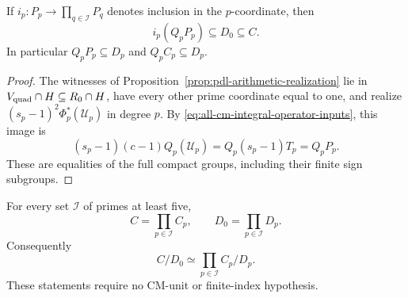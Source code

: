 \begin{lemma}\label{lem:all-cm-isolated-axes}
If \(i_p:P_p\to\prod_{q\in\mathcal I}P_q\)
denotes inclusion in the \(p\)-coordinate, then
\[
                           i_p(Q_pP_p)\subseteq D_0\subseteq C.
\]
In particular \(Q_pP_p\subseteq D_p\) and \(Q_pC_p\subseteq D_p\).
\end{lemma}

\begin{proof}
The witnesses of Proposition~\ref{prop:pdl-arithmetic-realization}
lie in \(V_{\rm quad}\cap H\subseteq R_0\cap H\),
have every other prime coordinate equal to one, and realize
\((s_p-1)^2\Phi_p^*(\mathcal U_p)\) in degree \(p\).
By \eqref{eq:all-cm-integral-operator-inputs}, this image is
\[
 (s_p-1)(c-1)Q_p(\mathcal U_p)
     =Q_p(s_p-1)T_p=Q_pP_p.
\]
These are equalities of the full compact groups,
including their finite sign subgroups.
\end{proof}

\begin{proposition}\label{prop:all-cm-exact-products}
For every set \(\mathcal I\) of primes at least five,
\begin{equation}
                         C=\prod_{p\in\mathcal I}C_p,\qquad
                         D_0=\prod_{p\in\mathcal I}D_p.
 \label{eq:all-cm-exact-products}
\end{equation}
Consequently
\[
                         C/D_0\simeq\prod_{p\in\mathcal I}C_p/D_p.
\]
These statements require no CM-unit or finite-index hypothesis.
\end{proposition}

